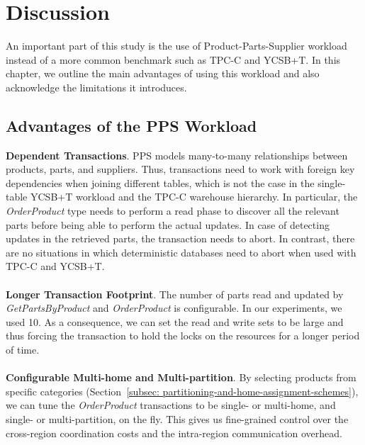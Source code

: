 \section{Discussion}
\label{sec: discussion}
An important part of this study is the use of Product-Parts-Supplier workload instead of a more common benchmark such as TPC-C and YCSB+T. In this chapter, we outline the main advantages of using this workload and also acknowledge the limitations it introduces.

\subsection{Advantages of the PPS Workload}
\label{subsec: advantages-of-the-pps-workload}

\textbf{Dependent Transactions}. PPS models many-to-many relationships between products, parts, and suppliers. Thus, transactions need to work with foreign key dependencies when joining different tables, which is not the case in the single-table YCSB+T workload and the TPC-C warehouse hierarchy. In particular, the \textit{OrderProduct} type needs to perform a read phase to discover all the relevant parts before being able to perform the actual updates. In case of detecting updates in the retrieved parts, the transaction needs to abort. In contrast, there are no situations in which deterministic databases need to abort when used with TPC-C and YCSB+T.\\\\
\textbf{Longer Transaction Footprint}. The number of parts read and updated by \textit{GetPartsByProduct} and \textit{OrderProduct} is configurable. In our experiments, we used 10. As a consequence, we can set the read and write sets to be large and thus forcing the transaction to hold the locks on the resources for a longer period of time.\\\\
\textbf{Configurable Multi-home and Multi-partition}. By selecting products from specific categories (Section~\ref{subsec: partitioning-and-home-assignment-schemes}), we can tune the \textit{OrderProduct} transactions to be single- or multi-home, and single- or multi-partition, on the fly. This gives us fine-grained control over the cross-region coordination costs and the intra-region communication overhead.

